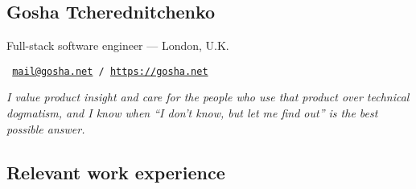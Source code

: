 \documentclass[a4paper,11pt]{article}
\begin{document}
\begin{center}
  \section*{Gosha Tcherednitchenko}
  Full-stack software engineer — London, U.K.

  \texttt{
    \href{mailto:mail@gosha.net}{mail@gosha.net} /
    \href{https://gosha.net}{https://gosha.net}
  }
\end{center}

\textit{I value product insight and care for the people who use that product over technical dogmatism, and I know when “I don’t know, but let me find out” is the best possible answer.}

\subsection*{Relevant work experience}
\end{document}
